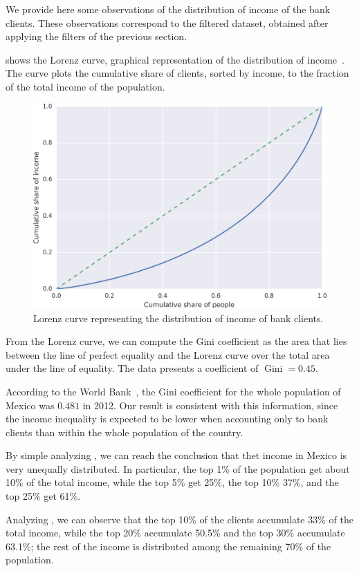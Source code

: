 We provide here some observations of the distribution of income of the bank clients. These observations correspond to the filtered dataset, obtained after applying the filters of the previous section.

 shows the Lorenz curve, graphical representation of the distribution of income~\cite{satchell1987}. The curve plots the cumulative share of clients, sorted by income, to the fraction of the total income of the population.

\begin{figure}
\centering
\includegraphics[width=0.75\columnwidth]{figures/cumulative_income.png}
\caption{Lorenz curve representing the distribution of income of bank clients.}
\label{fig:lorenz}
\end{figure}

From the Lorenz curve, we can compute the Gini coefficient as the area that lies between the line of perfect equality and the Lorenz curve over the total area under the line of equality. The data presents a coefficient of $\operatorname{Gini} = 0.45$.

According to the World Bank~\cite{world_bank}, the Gini coefficient for the whole population of Mexico was $0.481$ in 2012. Our result is consistent with this information, since the income inequality is expected to be lower when accounting only to bank clients than within the whole population of the country.

By simple analyzing , we can reach the conclusion that thet income in Mexico is very unequally distributed. In particular, the top 1\% of the population get about 10\% of the total income, while the top 5\% get 25\%, the top 10\% 37\%, and the top 25\% get 61\%.

Analyzing , we can observe that the top 10\% of the clients accumulate 33\% of the total income, while the top 20\% accumulate 50.5\% and the top 30\% accumulate 63.1\%; the rest of the income is distributed among the remaining 70\% of the population.

